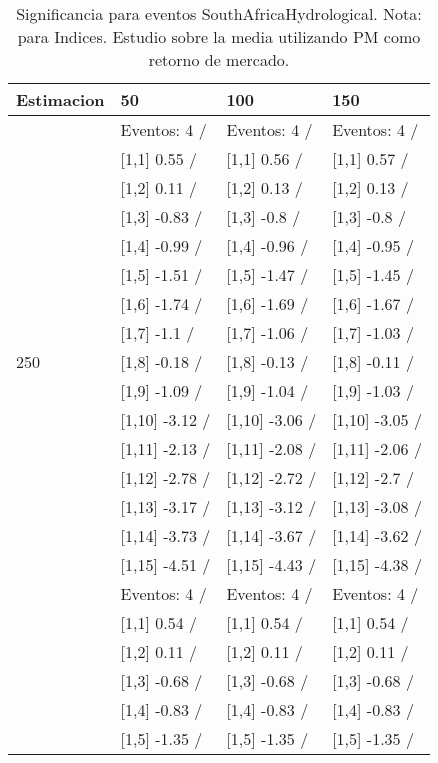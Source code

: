\begin{table}

\caption{Significancia para eventos SouthAfricaHydrological. Nota: para Indices. Estudio sobre la media utilizando PM como retorno de mercado.}
\centering
\begin{tabular}[t]{llll}
\toprule
Estimacion & 50 & 100 & 150\\
\midrule
 & Eventos:  4 / & Eventos:  4 / & Eventos:  4 /\\
 & {}[1,1] 0.55  / & {}[1,1] 0.56  / & {}[1,1] 0.57  /\\
 & {}[1,2] 0.11  / & {}[1,2] 0.13  / & {}[1,2] 0.13  /\\
 & {}[1,3] -0.83  / & {}[1,3] -0.8  / & {}[1,3] -0.8  /\\
 & {}[1,4] -0.99  / & {}[1,4] -0.96  / & {}[1,4] -0.95  /\\
\addlinespace
 & {}[1,5] -1.51  / & {}[1,5] -1.47  / & {}[1,5] -1.45  /\\
 & {}[1,6] -1.74  / & {}[1,6] -1.69  / & {}[1,6] -1.67  /\\
 & {}[1,7] -1.1  / & {}[1,7] -1.06  / & {}[1,7] -1.03  /\\
250 & {}[1,8] -0.18  / & {}[1,8] -0.13  / & {}[1,8] -0.11  /\\
 & {}[1,9] -1.09  / & {}[1,9] -1.04  / & {}[1,9] -1.03  /\\
\addlinespace
 & {}[1,10] -3.12  / & {}[1,10] -3.06  / & {}[1,10] -3.05  /\\
 & {}[1,11] -2.13  / & {}[1,11] -2.08  / & {}[1,11] -2.06  /\\
 & {}[1,12] -2.78  / & {}[1,12] -2.72  / & {}[1,12] -2.7  /\\
 & {}[1,13] -3.17  / & {}[1,13] -3.12  / & {}[1,13] -3.08  /\\
 & {}[1,14] -3.73  / & {}[1,14] -3.67  / & {}[1,14] -3.62  /\\
\addlinespace
 & {}[1,15] -4.51  / & {}[1,15] -4.43  / & {}[1,15] -4.38  /\\
 & Eventos:  4 / & Eventos:  4 / & Eventos:  4 /\\
 & {}[1,1] 0.54  / & {}[1,1] 0.54  / & {}[1,1] 0.54  /\\
 & {}[1,2] 0.11  / & {}[1,2] 0.11  / & {}[1,2] 0.11  /\\
 & {}[1,3] -0.68  / & {}[1,3] -0.68  / & {}[1,3] -0.68  /\\
\addlinespace
 & {}[1,4] -0.83  / & {}[1,4] -0.83  / & {}[1,4] -0.83  /\\
 & {}[1,5] -1.35  / & {}[1,5] -1.35  / & {}[1,5] -1.35  /\\

\end{tabular}
\end{table}
